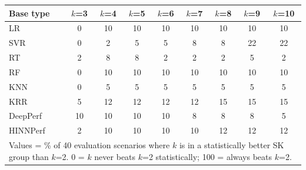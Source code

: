 \begin{tabular}{lcccccccc}
\toprule
Base type & $k$=3 & $k$=4 & $k$=5 & $k$=6 & $k$=7 & $k$=8 & $k$=9 & $k$=10 \\
\midrule
LR & 0 & 10 & 10 & 10 & 10 & 10 & 10 & 10 \\
SVR & 0 & 2 & 5 & 5 & 8 & 8 & 22 & 22 \\
RT & 2 & 8 & 8 & 2 & 2 & 2 & 5 & 2 \\
RF & 0 & 10 & 10 & 10 & 10 & 10 & 10 & 10 \\
KNN & 0 & 5 & 5 & 5 & 5 & 5 & 5 & 5 \\
KRR & 5 & 12 & 12 & 12 & 12 & 15 & 15 & 15 \\
DeepPerf & 10 & 10 & 10 & 10 & 8 & 8 & 8 & 5 \\
HINNPerf & 2 & 10 & 10 & 10 & 10 & 12 & 12 & 12 \\
\bottomrule
\multicolumn{9}{l}{\footnotesize Values = \% of 40 evaluation scenarios where $k$ is in a statistically better SK group than $k$=2. 0 = $k$ never beats $k$=2 statistically; 100 = always beats $k$=2.}} \\
\end{tabular}
